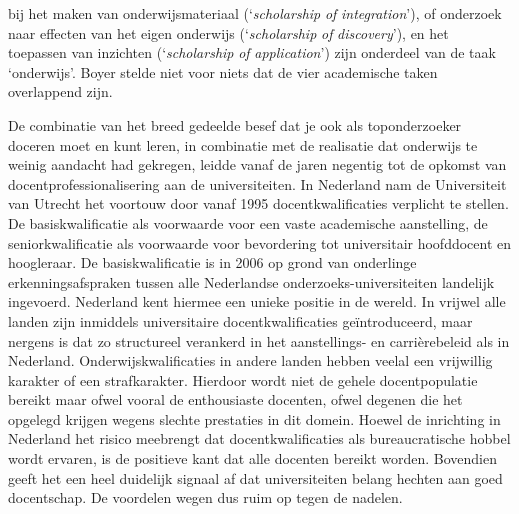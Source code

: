 \documentclass[smallauthor, chapterhaspagenum, nochapterinheader, pagenuminheader,  bigchapnum,medium2, tocpages,  garamond, titleinheader]{jote-book}
\begin{document}
bij het maken van onderwijsmateriaal (‘\emph{scholarship}\emph{ of }\emph{integration}'), of onderzoek naar effecten van het eigen onderwijs (‘\emph{scholarship}\emph{ of }\emph{discovery}'), en het toepassen van inzichten (‘\emph{scholarship}\emph{ of }\emph{application}') zijn onderdeel van de taak ‘onderwijs'. Boyer stelde niet voor niets dat de vier academische taken overlappend zijn.



	De combinatie van het breed gedeelde besef dat je ook als toponderzoeker doceren moet en kunt leren, in combinatie met de realisatie dat onderwijs te weinig aandacht had gekregen, leidde vanaf de jaren negentig tot de opkomst van docentprofessionalisering aan de universiteiten. In Nederland nam de Universiteit van Utrecht het voortouw door vanaf 1995 docentkwalificaties verplicht te stellen. De basiskwalificatie als voorwaarde voor een vaste academische aanstelling, de seniorkwalificatie als voorwaarde voor bevordering tot universitair hoofddocent en hoogleraar. De basiskwalificatie is in 2006 op grond van onderlinge erkenningsafspraken tussen alle Nederlandse onderzoeks-universiteiten landelijk ingevoerd. Nederland kent hiermee een unieke positie in de wereld. In vrijwel alle landen zijn inmiddels universitaire docentkwalificaties geïntroduceerd, maar nergens is dat zo structureel verankerd in het aanstellings- en carrièrebeleid als in Nederland. Onderwijskwalificaties in andere landen hebben veelal een vrijwillig karakter of een strafkarakter. Hierdoor wordt niet de gehele docentpopulatie bereikt maar ofwel vooral de enthousiaste docenten, ofwel degenen die het opgelegd krijgen wegens slechte prestaties in dit domein. Hoewel de inrichting in Nederland het risico meebrengt dat docentkwalificaties als bureaucratische hobbel wordt ervaren, is de positieve kant dat alle docenten bereikt worden. Bovendien geeft het een heel duidelijk signaal af dat universiteiten belang hechten aan goed docentschap. De voordelen wegen dus ruim op tegen de nadelen.
\end{document}
